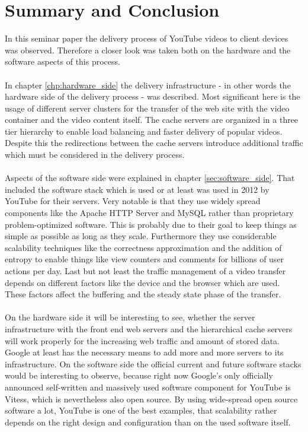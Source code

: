 \section{Summary and Conclusion}

In this seminar paper the delivery process of YouTube videos to client devices was observed. Therefore a closer look was taken both on the hardware and the software aspects of this process. \\
\\
In chapter \ref{chp:hardware_side} the delivery infrastructure - in other words the hardware side of the delivery process - was described. Most significant here is the usage of different server clusters for the transfer of the web site with the video container and the video content itself. The cache servers are organized in a three tier hierarchy to enable load balancing and faster delivery of popular videos. Despite this the redirections between the cache servers introduce additional traffic which must be considered in the delivery process.\\
\\
Aspects of the software side were explained in chapter \ref{sec:software_side}. That included the software stack which is used or at least was used in 2012 by YouTube for their servers. Very notable is that they use widely spread components like the Apache HTTP Server and MySQL rather than proprietary problem-optimized software. This is probably due to their goal to keep things as simple as possible as long as they scale. Furthermore they use considerable scalability techniques like the correctness approximation and the addition of entropy to enable things like view counters and comments for billions of user actions per day. Last but not least the traffic management of a video transfer depends on different factors like the device and the browser which are used. These factors affect the buffering and the steady state phase of the transfer.\\
\\
On the hardware side it will be interesting to see, whether the server infrastructure with the front end web servers and the hierarchical cache servers will work properly for the increasing web traffic and amount of stored data. Google at least has the necessary means to add more and more servers to its infrastructure. On the software side the official current and future software stacks would be interesting to observe, because right now Google's only officially announced self-written and massively used software component for YouTube is Vitess, which is nevertheless also open source. By using wide-spread open source software a lot, YouTube is one of the best examples, that scalability rather depends on the right design and configuration than on the used software itself.

